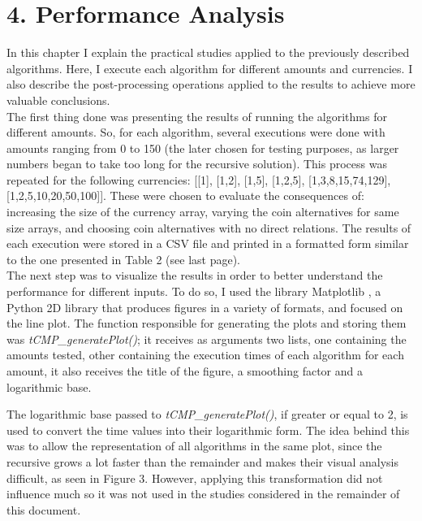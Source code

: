 \documentclass[shortpaper]{revdetua}
\begin{document}
\section*{4. Performance Analysis}

In this chapter I explain the practical studies applied to the previously 
described algorithms.
Here, I execute each algorithm for different amounts and currencies.
I also describe the post-processing operations applied to the results to achieve 
more valuable conclusions. \\

The first thing done was presenting the results of running the algorithms for 
different amounts.
So, for each algorithm, several executions were done with amounts ranging from
0 to 150 (the later chosen for testing purposes, as larger numbers began to take
too long for the recursive solution).
This process was repeated for the following currencies: 
[[1], [1,2], [1,5], [1,2,5], [1,3,8,15,74,129], [1,2,5,10,20,50,100]].
These were chosen to evaluate the consequences of: increasing the size of the 
currency array, varying the coin alternatives for same size arrays, and choosing
coin alternatives with no direct relations.
The results of each execution were stored in a CSV file and printed in a 
formatted form similar to the one presented in Table 2 (see last page). \\

The next step was to visualize the results in order to better understand the 
performance for different inputs.
To do so, I used the library Matplotlib \cite{mpl}, a Python 2D library that 
produces figures in a variety of formats, and focused on the line plot.
The function responsible for generating the plots and storing them was
{\it tCMP\_generatePlot()\/}; it receives as arguments two lists, one containing 
the amounts tested, other containing the execution times of each algorithm for
each amount, it also receives the title of the figure, a smoothing factor and a 
logarithmic base.

The logarithmic base passed to {\it tCMP\_generatePlot()\/}, if greater or equal
to 2, is used to convert the time values into their logarithmic form.
The idea behind this was to allow the representation of all algorithms in the 
same plot, since the recursive grows a lot faster than the remainder and makes 
their visual analysis difficult, as seen in Figure 3.
However, applying this transformation did not influence much so it was not used 
in the studies considered in the remainder of this document.
\end{document}
